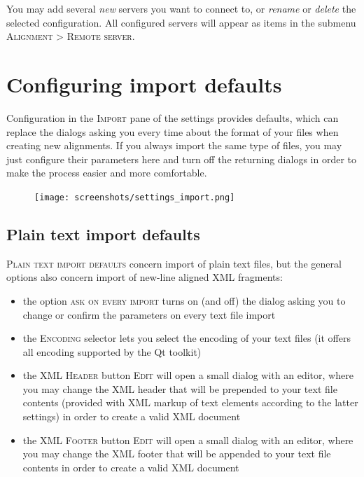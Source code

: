\documentclass[a4paper,10pt,oneside]{book}
\newcommand{\menu}[1]{\textsc{#1}}
\begin{document}
You may add several \emph{new} servers you want to connect to, or \emph{rename} or \emph{delete} the selected configuration. All configured servers will appear as items in the submenu \menu{Alignment} > \menu{Remote server}.

\section{Configuring import defaults}\label{ch:detail:config:import}

Configuration in the \menu{Import} pane of the settings provides defaults, which can replace the dialogs asking you every time about the format of your files when creating new alignments. If you always import the same type of files, you may just configure their parameters here and turn off the returning dialogs in order to make the process easier and more comfortable.

\begin{figure}[htb!]
 \texttt{[image: screenshots/settings\_import.png]}
\end{figure}

\subsection{Plain text import defaults}\label{ch:detail:config:import:txt}

\menu{Plain text import defaults} concern import of plain text files, but the general options also concern import of new-line aligned XML fragments:

\begin{itemize}
 \item the option \menu{ask on every import} turns on (and off) the dialog asking you to change or confirm the parameters on every text file import
 \item the \menu{Encoding} selector lets you select the encoding of your text files (it offers all encoding supported by the Qt toolkit)
 \item the \menu{XML Header} button \menu{Edit} will open a small dialog with an editor, where you may change the XML header that will be prepended to your text file contents (provided with XML markup of text elements according to the latter settings) in order to create a valid XML document
 \item the \menu{XML Footer} button \menu{Edit} will open a small dialog with an editor, where you may change the XML footer that will be appended to your text file contents in order to create a valid XML document
\end{itemize}
\end{document}
